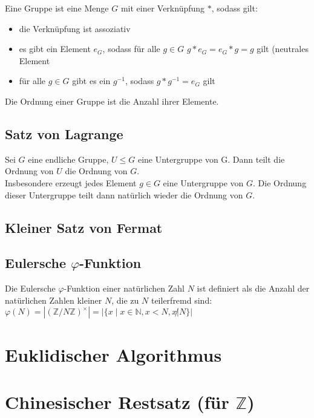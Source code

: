 \documentclass[a4paper,twoside,DIV15,BCOR12mm]{scrbook}
\begin{document}
Eine Gruppe ist eine Menge $G$ mit einer Verknüpfung $*$, sodass gilt:

\begin{itemize}
	\item die Verknüpfung ist assoziativ
	\item es gibt ein Element $e_G$, sodass für alle $g \in G$ $g * e_G = e_G * g =g$ gilt (neutrales Element
	\item für alle $g \in G$ gibt es ein $g^{-1}$, sodass $g * g^{-1} = e_G$ gilt
\end{itemize}

Die Ordnung einer Gruppe ist die Anzahl ihrer Elemente.

\subsection{Satz von Lagrange}

Sei $G$ eine endliche Gruppe, $U \leq G$ eine Untergruppe von G. Dann teilt die Ordnung von $U$ die Ordnung von $G$.\\

Insbesondere erzeugt jedes Element $g \in G$ eine Untergruppe von $G$. Die Ordnung dieser Untergruppe teilt dann natürlich wieder die Ordnung von $G$.

\subsection{Kleiner Satz von Fermat}

\subsection{Eulersche $\varphi$-Funktion}

Die Eulersche $\varphi$-Funktion einer natürlichen Zahl $N$ ist definiert als die Anzahl der natürlichen Zahlen kleiner $N$, die zu $N$ teilerfremd sind: $\varphi(N) = \left|(\mathbb{Z}/N\mathbb{Z})^\times \right| = \left| \{ x \mid x \in \mathbb{N}, x < N, x \not| N \} \right|$

\section{Euklidischer Algorithmus}

\section{Chinesischer Restsatz (für $\mathbb{Z}$)}

\appendix

\renewcommand{\indexname}{Stichwortverzeichnis}
\printindex

%
\end{document}
